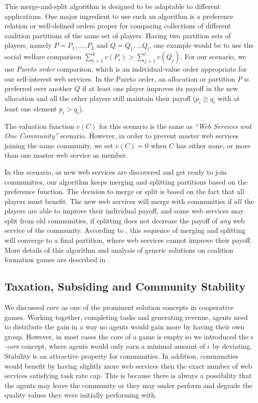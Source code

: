 \documentclass[10pt,journal,cspaper,compsoc]{IEEEtran}
\begin{document}
This merge-and-split algorithm is designed to be adaptable to
different applications. One major ingredient to use such an
algorithm is a preference relation or well-defined orders proper
for comparing collections of different coalition partitions of the
same set of players. Having two partition sets of players, namely
$P = {P_1,...,P_k}$ and $Q = {Q_1,...Q_l}$, one example would be
to use the social welfare comparison $\sum^k_{i=1}v(P_i) >
\sum^l_{j=1}v(Q_j)$. For our scenario, we use \emph{Pareto order}
comparison, which is an individual-value order appropriate for our
self-interest web services. In the Pareto order, an allocation or
partition $P$ is preferred over another $Q$ if at least one player
improves its payoff in the new allocation and all the other
players still maintain their payoff ($p_i \geq q_i$ with at least
one element $p_i > q_i$).

The valuation function $v(C)$ for this scenario is the same as
\emph{``Web Services and One Community''} scenario. However, in
order to prevent master web services joining the same community,
we set $v(C) = 0$ when $C$ has either none, or more than one
master web service as member.

In this scenario, as new web services are discovered and get ready
to join communities, our algorithm keeps merging and splitting
partitions based on the preference function. The decision to merge
or split is based on the fact that all players must benefit. The
new web services will merge with communities if $all$ the players
are able to improve their individual payoff, and some web services
may split from old communities, if splitting does not decrease the
payoff of \emph{any} web service of the community. According to
\cite{DBLP:journals/corr/abs-cs-0605132}, this sequence of merging
and splitting will converge to a final partition, where web
services cannot improve their payoff. More details of this
algorithm and analysis of generic solutions on coalition formation
games are described in \cite{DBLP:journals/igtr/AptW09}.

\subsection{Taxation, Subsiding and Community Stability}\label{s:tax}

We discussed $core$ as one of the prominent solution concepts in cooperative games. Working together, completing tasks and generating revenue, agents need to distribute the gain in a way no agents would gain more by having their own group. However, in most cases the core of a game is empty so we introduced the \emph{$\epsilon$-core} concept, where agents would only earn a minimal amount of $\epsilon$ by deviating. Stability is an attractive property for communities. In addition, communities would benefit by having slightly more web services then the exact number of web services satisfying task rate cap. This is because  there is always a possibility that the agents may leave the community or they may under perform and degrade the quality values they were initially performing with.
\end{document}
